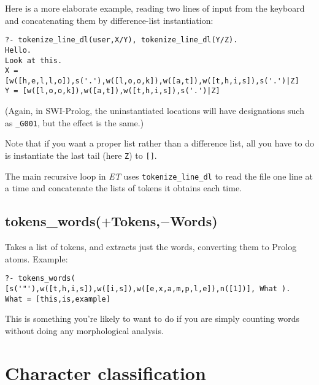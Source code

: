 \documentclass[12pt]{article}
\begin{document}
Here is a more elaborate example, reading two lines of input from
the keyboard and concatenating them by difference-list instantiation:
\begin{verbatim}
?- tokenize_line_dl(user,X/Y), tokenize_line_dl(Y/Z).
Hello.
Look at this.
X = [w([h,e,l,l,o]),s('.'),w([l,o,o,k]),w([a,t]),w([t,h,i,s]),s('.')|Z]
Y = [w([l,o,o,k]),w([a,t]),w([t,h,i,s]),s('.')|Z]
\end{verbatim}
(Again, in SWI-Prolog, the uninstantiated locations will have designations
such as \verb"_G001", but the effect is the same.)

Note that if you want a proper list rather than a difference list, all you
have to do is instantiate the last tail (here \verb"Z") to \verb"[]".

The main recursive loop in \emph{ET} uses \verb"tokenize_line_dl" to read the file
one line at a time and concatenate the lists of tokens it obtains each time.


\subsection*{tokens\_words($+$Tokens,$-$Words)}

Takes a list of tokens, and extracts just the words, converting them to
Prolog atoms.  Example:
\begin{verbatim}
?- tokens_words( [s('"'),w([t,h,i,s]),w([i,s]),w([e,x,a,m,p,l,e]),n([1])], What ).
What = [this,is,example]
\end{verbatim}
This is something you're likely to want to do if you are simply counting words
without doing any morphological analysis.




\section{Character classification}
\end{document}
